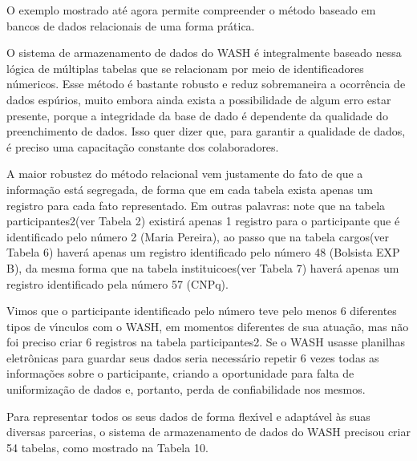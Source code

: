 \documentclass[
12pt,		%
openright,	%
twoside,  %
a4paper,			%
chapter=TITLE,		%
english,			%
french,				%
spanish,			%
brazil				%
]{USPSC-classe/USPSC}
\begin{document}
O exemplo mostrado at\'e agora permite compreender o m\'etodo baseado em bancos de dados relacionais de uma forma pr\'atica.








O sistema de armazenamento de dados do WASH \'e integralmente baseado nessa l\'ogica de m\'ultiplas tabelas que se relacionam por meio de identificadores n\'umericos. Esse m\'etodo \'e bastante robusto e reduz sobremaneira a ocorr\^encia de dados esp\'urios, muito embora ainda exista a possibilidade de algum erro estar presente, porque a integridade da base de dado \'e dependente da qualidade do preenchimento de dados. Isso quer dizer que, para garantir a qualidade de dados, \'e preciso uma capacita\c{c}\~ao constante dos colaboradores.








A maior robustez do m\'etodo relacional vem justamente do fato de que a informa\c{c}\~ao est\'a segregada, de forma que em cada tabela exista apenas um registro para cada fato representado. Em outras palavras: note que na tabela \textquotedbl participantes2\textquotedbl  (ver Tabela 2) existir\'a apenas 1 registro para o participante que \'e identificado pelo n\'umero 2 (Maria Pereira), ao passo que na tabela \textquotedbl cargos\textquotedbl  (ver Tabela 6) haver\'a apenas um registro identificado pelo n\'umero 48 (Bolsista EXP B), da mesma forma que na tabela \textquotedbl instituicoes\textquotedbl  (ver Tabela 7) haver\'a apenas um registro identificado pela n\'umero 57 (CNPq).








Vimos que o participante identificado pelo n\'umero \textquotedbl  teve  pelo menos 6 diferentes tipos de v\'{\i}nculos com o WASH, em momentos diferentes de sua atua\c{c}\~ao, mas n\~ao foi preciso criar 6 registros na tabela \textquotedbl participantes2\textquotedbl . Se o WASH usasse planilhas eletr\^onicas para guardar seus dados seria necess\'ario repetir 6 vezes todas as informa\c{c}\~oes sobre o participante, criando a oportunidade para falta de uniformiza\c{c}\~ao de dados e, portanto, perda de confiabilidade nos mesmos.








Para representar todos os seus dados de forma flex\'{\i}vel e adapt\'avel \`as suas diversas parcerias, o sistema de armazenamento de dados do WASH precisou criar 54 tabelas, como mostrado na Tabela 10.
\end{document}
